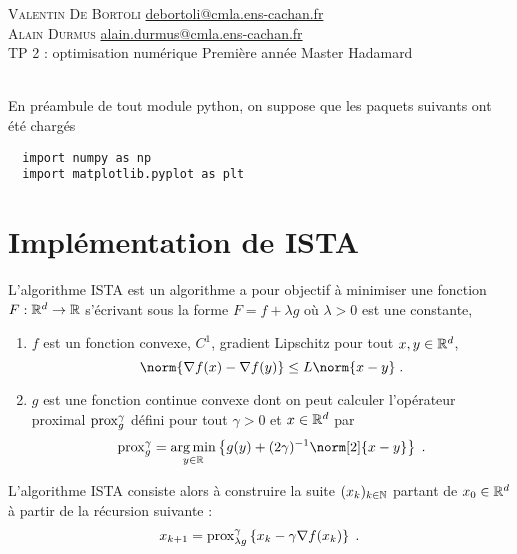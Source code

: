 \documentclass[a4paper,french,12pt]{article}
\begin{document}
\noindent
 \textsc{Valentin De Bortoli} \hfill \url{debortoli@cmla.ens-cachan.fr} \\
    \textsc{Alain Durmus} \hfill \url{alain.durmus@cmla.ens-cachan.fr}
    \\
    TP 2 : optimisation numérique\hfill
    Première année Master Hadamard\\
\hrulefill\ \\
    
 \vspace{-5cm} 


En préambule de tout module python, on suppose que les paquets suivants ont été chargés
\begin{lstlisting}
  import numpy as np
  import matplotlib.pyplot as plt
\end{lstlisting}

\section{Implémentation de ISTA}
\label{sec:impl-de-ista}
L'algorithme ISTA \cite{beck09_fast_iterat_shrin_thres_algor} est un
algorithme a pour objectif à minimiser une fonction $F : \mathbb{R}^d \to \mathbb{R}$ s'écrivant sous la
forme $F = f + \lambda g$ où $\lambda >0$ est une constante, 
\begin{enumerate}
\item $f$ est un fonction convexe, $C^1$, gradient Lipschitz \ie pour
  tout $x,y \in \mathbb{R}^d$,
  \begin{equation*}
    \norm{\nabla f(x) - \nabla f(y) } \leq L \norm{x-y } \eqsp.
  \end{equation*}
\item $g$ est une fonction continue convexe dont on peut calculer l'opérateur proximal $\operatorname{prox}_g^{\gamma}$ défini pour tout $\gamma >0$ et $x \in \mathbb{R}^d$ par
  \begin{equation*}
    \prox_g^{\gamma}  = \argmin_{y \in \rset} \defEns{g(y) + (2 \gamma)^{-1} \norm[2]{x-y}} \eqsp.
  \end{equation*}
\end{enumerate}

L'algorithme ISTA consiste alors à construire la suite
$(x_k)_{k \in \mathbb{N}}$ partant de $x_0 \in \mathbb{R}^d$ à partir de la récursion suivante :
\begin{equation*}
  x_{k+1} = \operatorname{prox}_{\lambda g}^{\gamma} \left\lbrace x_k - \gamma \nabla f(x_k) \right\rbrace \;.
\end{equation*}
\end{document}
